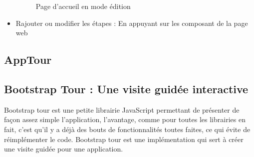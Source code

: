 \documentclass[a4paper]{article}
\begin{document}
\begin{itemize}
 \begin{figure}[H]
	\centering
  		\caption{Page d'accueil en mode édition}
	\end{figure}

\item Rajouter ou modifier les étapes : En appuyant sur les composant de la page web 





\end{itemize}
\newpage
\subsection{AppTour}     

\subsection{Bootstrap Tour : Une visite guidée interactive}
 
Bootstrap tour est une petite librairie JavaScript permettant de présenter de façon assez simple l’application, l’avantage, comme pour toutes les librairies en fait, c’est qu’il y a déjà des bouts de fonctionnalités toutes faites, ce qui évite de réimplémenter le code. Bootstrap tour est une implémentation qui sert à créer une visite guidée pour une application. 
\end{document}

